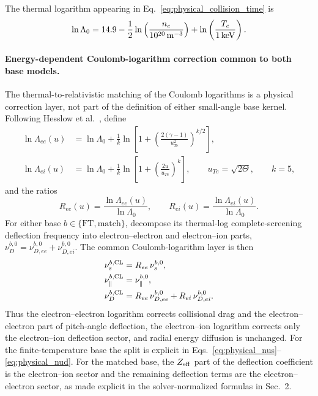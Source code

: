 \documentclass[11pt]{article}
\begin{document}
The thermal logarithm appearing in Eq.~\eqref{eq:physical_collision_time} is
\begin{equation}
 \ln\Lambda_0
 =14.9-\frac12\ln\left(\frac{n_e}{10^{20}\,{\rm m}^{-3}}\right)
 +\ln\left(\frac{T_e}{1\,{\rm keV}}\right).
 \label{eq:physical_thermal_log}
\end{equation}

\paragraph{Energy-dependent Coulomb-logarithm correction common to both base models.}
The thermal-to-relativistic matching of the Coulomb logarithms is a physical correction
layer, not part of the definition of either small-angle base kernel.  Following Hesslow
et al.~\cite{Hesslow2018Collision}, define
\begin{align}
 \ln\Lambda_{ee}(u)
 &=\ln\Lambda_0+\frac{1}{k}
 \ln\left[
  1+\left(\frac{2(\gamma-1)}{u_{Te}^2}\right)^{k/2}
 \right],\\
 \ln\Lambda_{ei}(u)
 &=\ln\Lambda_0+\frac{1}{k}
 \ln\left[1+\left(\frac{2u}{u_{Te}}\right)^k\right],
 \qquad
 u_{Te}=\sqrt{2\Theta},
 \qquad k=5,
 \label{eq:physical_matched_logs}
\end{align}
and the ratios
\begin{equation}
 R_{ee}(u)=\frac{\ln\Lambda_{ee}(u)}{\ln\Lambda_0},
 \qquad
 R_{ei}(u)=\frac{\ln\Lambda_{ei}(u)}{\ln\Lambda_0}.
 \label{eq:physical_log_ratios}
\end{equation}
For either base $b\in\{\mathrm{FT},\mathrm{match}\}$, decompose its thermal-log
complete-screening deflection frequency into electron--electron and electron--ion parts,
$\nu_D^{b,0}=\nu_{D,ee}^{b,0}+\nu_{D,ei}^{b,0}$.  The common Coulomb-logarithm layer is
then
\begin{align}
 \nu_s^{b,\rm CL}&=R_{ee}\,\nu_s^{b,0},\\
 \nu_\parallel^{b,\rm CL}&=\nu_\parallel^{b,0},\\
 \nu_D^{b,\rm CL}
 &=R_{ee}\,\nu_{D,ee}^{b,0}
  +R_{ei}\,\nu_{D,ei}^{b,0}.
 \label{eq:physical_common_log_overlay}
\end{align}
Thus the electron--electron logarithm corrects collisional drag and the
 electron--electron part of pitch-angle deflection, the electron--ion logarithm corrects
only the electron--ion deflection sector, and radial energy diffusion is unchanged.
For the finite-temperature base the split is explicit in
Eqs.~\eqref{eq:physical_nus}--\eqref{eq:physical_nud}.  For the matched base, the
$Z_{\rm eff}$ part of the deflection coefficient is the electron--ion sector and the
remaining deflection terms are the electron--electron sector, as made explicit in the
solver-normalized formulas in Sec.~2.
\end{document}
